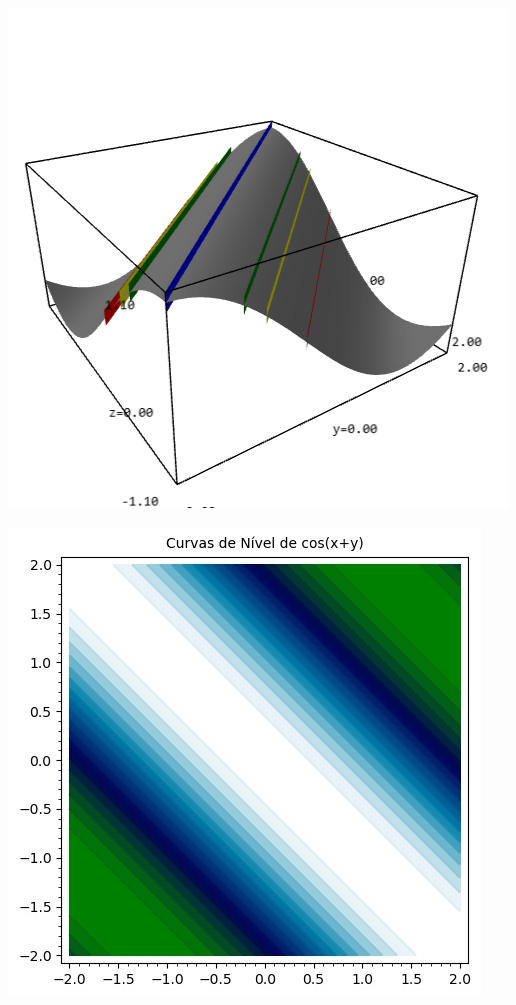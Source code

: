 \documentclass[../main.tex]{subfiles}
\begin{document}
\begin{solucao}
			\begin{center}
				\begin{minipage}{0.45\textwidth}
					\centering
					\includegraphics[width=\textwidth]{imagens/lista03/picture_lista03_q01_item03.png}
				\end{minipage}
				\hfill
				\begin{minipage}{0.45\textwidth}
					\centering
					\includegraphics[width=\textwidth]{imagens/lista03/picture_lista03_q01_item03_02.jpg}
				\end{minipage}
			\end{center}
			

\end{solucao}
\end{document}
